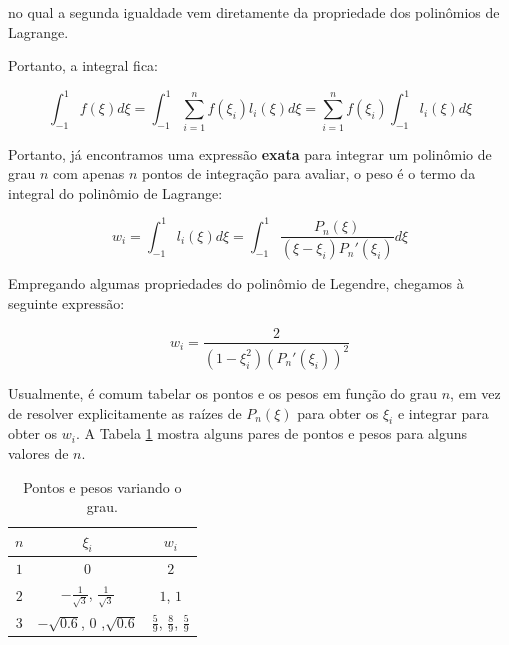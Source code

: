         \noindent no qual a segunda igualdade vem diretamente da propriedade dos polinômios de Lagrange.

        Portanto, a integral fica:

        \begin{equation}
            \int_{-1}^{1} f(\xi) d\xi = \int_{-1}^{1} \sum_{i=1}^n f(\xi_i) l_i(\xi) d\xi =  \sum_{i=1}^n f(\xi_i) \int_{-1}^{1} l_i(\xi) d\xi
        \end{equation}

        Portanto, já encontramos uma expressão \textbf{exata} para integrar um polinômio de grau $n$ com apenas $n$ pontos de integração para avaliar, o peso é o termo da integral do polinômio de Lagrange:

        \begin{equation}
            w_i = \int_{-1}^{1} l_i(\xi) d\xi = \int_{-1}^{1} \frac{P_n(\xi)}{\left(\xi-\xi_i\right)P_n'(\xi_i)} d\xi
        \end{equation}

        Empregando algumas propriedades do polinômio de Legendre, chegamos à seguinte expressão:

        \begin{equation}
            w_i = \frac{2}{\left(1-\xi_i^2\right)\left(P_n'(\xi_i)\right)^2}
        \end{equation}

        Usualmente, é comum tabelar os pontos e os pesos em função do grau $n$, em vez de resolver explicitamente as raízes de $P_n(\xi)$ para obter os $\xi_i$ e integrar para obter os $w_i$. A Tabela \ref{tab:gauss} mostra alguns pares de pontos e pesos para alguns valores de $n$.

        \begin{table}[h!]
        \centering
        \caption{Pontos e pesos variando o grau.}
        \label{tab:gauss}
        \begin{tabular}{|c|c|c|}
            \hline
            $n$  & $\xi_i$ & $w_i$ \\ \hline
            $1$ & $0$ & $2$ \\ \hline
            $2$ & $-\frac{1}{\sqrt{3}}$, $\frac{1}{\sqrt{3}}$ & $1$, $1$ \\ \hline
            $3$ & $-\sqrt{0.6}$, $0$ ,$\sqrt{0.6}$ & $\frac{5}{9}$, $\frac{8}{9}$, $\frac{5}{9}$ \\ \hline
        \end{tabular}
    \end{table}

